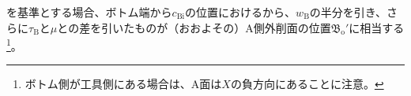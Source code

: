 \BottomOutcutAsideThickness を基準とする場合、ボトム端から$c_\mathrm{Bi}$の位置における\ODCenter から、\BottomEndACID$w_\mathrm B$の半分を引き、さらに\BottomOutcutAsideThickness$\tau_\mathrm B$と\PlatingThk$\mu$との差を引いたものが（おおよその）A側外削面の位置$\mathfrak B_\mathrm o'$に相当する
\footnote{ボトム側が工具側にある場合は、A面は$X$の負方向にあることに注意。}。


